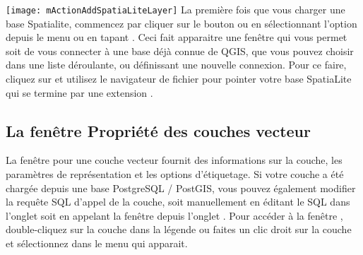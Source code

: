 \texttt{[image: mActionAddSpatiaLiteLayer]}
La première fois que vous charger une base Spatialite, commencez par cliquer sur le bouton  ou en sélectionnant l'option  depuis le menu  ou en tapant . Ceci fait apparaitre une fenêtre qui vous permet soit de vous connecter à une base déjà connue de QGIS, que vous pouvez choisir dans une liste déroulante, ou définissant une nouvelle connexion. Pour ce faire, cliquez sur  et utilisez le navigateur de fichier pour pointer votre base SpatiaLite qui se termine par une extension .

\subsection{La fenêtre Propriété des couches vecteur}\label{sec:vectorprops}

La fenêtre  pour une couche vecteur fournit des informations sur la couche, les paramètres de représentation et les options d'étiquetage. Si votre couche a été chargée depuis une base PostgreSQL / PostGIS, vous pouvez également modifier la requête SQL d'appel de la couche, soit manuellement en éditant le SQL dans l'onglet  soit en appelant la fenêtre  depuis l'onglet . Pour accéder à la fenêtre , double-cliquez sur la couche dans la légende ou faites un clic droit sur la couche et sélectionnez  dans le menu qui apparait.

